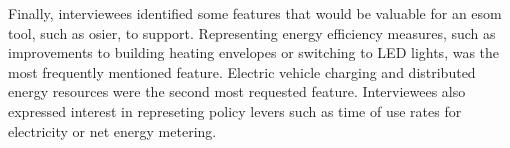 Finally, interviewees identified some features that would be valuable for an
\ac{esom} tool, such as \ac{osier}, to support. Representing energy efficiency
measures, such as improvements to building heating envelopes or switching to LED
lights, was the most frequently mentioned feature. Electric vehicle charging and
distributed energy resources were the second most requested feature.
Interviewees also expressed interest in represeting policy levers such as time
of use rates for electricity or net energy metering.